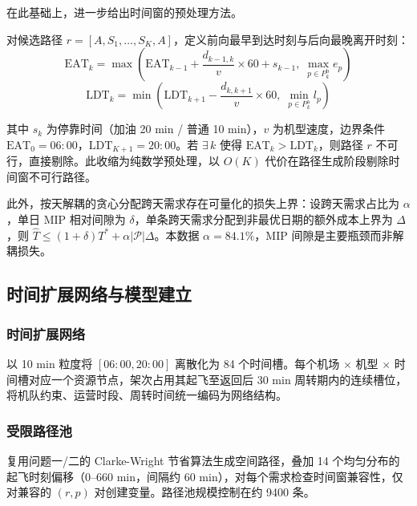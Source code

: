 在此基础上，进一步给出时间窗的预处理方法。

\begin{proposition}
\label{prop:cpm}
对候选路径 $r = [A, S_1, \ldots, S_K, A]$，定义前向最早到达时刻与后向最晚离开时刻：
\begin{equation}
\text{EAT}_k = \max\!\left(\text{EAT}_{k-1} + \frac{d_{k-1,k}}{v} \times 60 + s_{k-1},\; \max_{p \in P_k^{\mathrm{b}}} e_p\right)
\label{eq:eat}
\end{equation}
\begin{equation}
\text{LDT}_k = \min\!\left(\text{LDT}_{k+1} - \frac{d_{k,k+1}}{v} \times 60,\; \min_{p \in P_k^{\mathrm{a}}} l_p\right)
\label{eq:ldt}
\end{equation}

其中 $s_k$ 为停靠时间（加油 20 min / 普通 10 min），$v$ 为机型速度，边界条件 $\text{EAT}_0 = 06{:}00$，$\text{LDT}_{K+1} = 20{:}00$。若 $\exists\, k$ 使得 $\text{EAT}_k > \text{LDT}_k$，则路径 $r$ 不可行，直接剔除。此收缩为纯数学预处理，以 $O(K)$ 代价在路径生成阶段剔除时间窗不可行路径。
\end{proposition}

此外，按天解耦的贪心分配跨天需求存在可量化的损失上界：设跨天需求占比为 $\alpha$，单日 MIP 相对间隙为 $\delta$，单条跨天需求分配到非最优日期的额外成本上界为 $\Delta$，则 $\hat{T} \leq (1+\delta) T^* + \alpha |\mathcal{P}| \Delta$。本数据 $\alpha = 84.1\%$，MIP 间隙是主要瓶颈而非解耦损失。

\subsection{时间扩展网络与模型建立}

\subsubsection{时间扩展网络}

以 10 min 粒度将 $[06{:}00, 20{:}00]$ 离散化为 84 个时间槽\cite{ford1962}。每个机场 $\times$ 机型 $\times$ 时间槽对应一个资源节点，架次占用其起飞至返回后 30 min 周转期内的连续槽位，将机队约束、运营时段、周转时间统一编码为网络结构。

\subsubsection{受限路径池}

复用问题一/二的 Clarke-Wright 节省算法生成空间路径，叠加 14 个均匀分布的起飞时刻偏移（0--660 min，间隔约 60 min），对每个需求检查时间窗兼容性，仅对兼容的 $(r, p)$ 对创建变量。路径池规模控制在约 9400 条。

